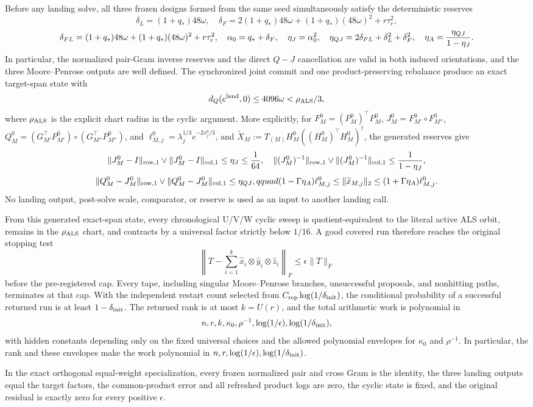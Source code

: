 \begin{theorem}
Before any landing solve, all three frozen designs formed from the same seed
simultaneously satisfy the deterministic reserves
\[
\delta_L=(1+q_*)48\omega,\quad
\delta_F=2(1+q_*)48\omega+(1+q_*)(48\omega)^2+r\tau_r^2,
\]
\[
\delta_{FL}=(1+q_*)48\omega+(1+q_*)(48\omega)^2+r\tau_r^2,\quad
\alpha_0=q_*+\delta_F,\quad \eta_J=\alpha_0^2,\quad
\eta_{QJ}=2\delta_{FL}+\delta_L^2+\delta_F^2,\quad
\eta_A={\eta_{QJ}\over1-\eta_J}.
\]
In particular, the normalized pair-Gram inverse reserves and the direct
$Q-J$ cancellation are valid in both induced orientations, and the three
Moore--Penrose outputs are well defined.  The synchronized joint commit and
one product-preserving rebalance produce an exact target-span state with
\[
 d_Q(e^{\rm land},0)\le4096\omega<\rho_{\rm ALS}/3,
\]
where $\rho_{\rm ALS}$ is the explicit chart radius in the cyclic argument.
More explicitly, for $F_M^0=(P_M^0)^\top P_M^0$,
$J_M^0=F_{M'}^0\circ F_{M''}^0$,
$Q_M^0=(G_{M'}^\top P_{M'}^0)\circ(G_{M''}^\top P_{M''}^0)$, and
$\ell_{M,j}^0=\lambda_j^{1/3}e^{-2s_j^0/3}$, and
$\widetilde X_M:=T_{(M)}H_M^0((H_M^0)^\top H_M^0)^\dagger$, the generated reserves give
\[
 \|J_M^0-I\|_{\rm row,1}\vee\|J_M^0-I\|_{\rm col,1}\le\eta_J\le{1\over64},
 \quad
 \|(J_M^0)^{-1}\|_{\rm row,1}\vee\|(J_M^0)^{-1}\|_{\rm col,1}
 \le{1\over1-\eta_J},
\]
\[
 \|Q_M^0-J_M^0\|_{\rm row,1}\vee\|Q_M^0-J_M^0\|_{\rm col,1}\le\eta_{QJ},qquad
 (1-\Gamma\eta_A)\ell_{M,j}^0\le\|\widetilde x_{M,j}\|_2
 \le(1+\Gamma\eta_A)\ell_{M,j}^0.
\]
No landing output, post-solve scale, comparator, or reserve is used as an
input to another landing call.

From this generated exact-span state, every chronological U/V/W cyclic sweep
is quotient-equivalent to the literal active ALS orbit, remains in the
$\rho_{\rm ALS}$ chart, and contracts by a universal factor strictly below
$1/16$.  A good covered run therefore reaches the original stopping test
\[
 \left\|T-\sum_{i=1}^k\widehat x_i\otimes\widehat y_i\otimes\widehat z_i
 \right\|_F\le\epsilon\|T\|_F
\]
before the pre-registered cap.  Every tape, including singular
Moore--Penrose branches, unsuccessful proposals, and nonhitting paths,
terminates at that cap.  With the independent restart count selected from
$C_{\rm rep}\log(1/\delta_{\rm init})$, the conditional probability of a
successful returned run is at least $1-\delta_{\rm init}$.  The returned rank
is at most $k=U(r)$, and the total arithmetic work is polynomial in
\[
 n,r,k,\kappa _0,\rho^{-1},\log(1/\epsilon),
 \log(1/\delta_{\rm init}),
\]
with hidden constants depending only on the fixed universal choices and the
allowed polynomial envelopes for $\kappa _0$ and $\rho^{-1}$.  In particular,
the rank and these envelopes make the work polynomial in
$n,r,\log(1/\epsilon),\log(1/\delta_{\rm init})$.

In the exact orthogonal equal-weight specialization, every frozen normalized
pair and cross Gram is the identity, the three landing outputs equal the
target factors, the common-product error and all refreshed product logs are
zero, the cyclic state is fixed, and the original residual is exactly zero
for every positive $\epsilon$.
\end{theorem}

